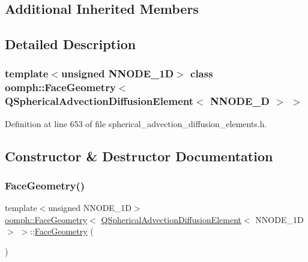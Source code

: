 \subsection*{Additional Inherited Members}


\subsection{Detailed Description}
\subsubsection*{template$<$unsigned N\+N\+O\+D\+E\+\_\+1D$>$\newline
class oomph\+::\+Face\+Geometry$<$ Q\+Spherical\+Advection\+Diffusion\+Element$<$ N\+N\+O\+D\+E\+\_\+D $>$ $>$}



Definition at line 653 of file spherical\+\_\+advection\+\_\+diffusion\+\_\+elements.\+h.



\subsection{Constructor \& Destructor Documentation}
\mbox{\label{classoomph_1_1FaceGeometry_3_01QSphericalAdvectionDiffusionElement_3_01NNODE__1D_01_4_01_4_a8ed2838c5dacbfa9facfb20466a60039}} 
\subsubsection{\texorpdfstring{Face\+Geometry()}{FaceGeometry()}}
{\footnotesize\ttfamily template$<$unsigned N\+N\+O\+D\+E\+\_\+1D$>$ \\
\hyperlink{classoomph_1_1FaceGeometry}{oomph\+::\+Face\+Geometry}$<$ \hyperlink{classoomph_1_1QSphericalAdvectionDiffusionElement}{Q\+Spherical\+Advection\+Diffusion\+Element}$<$ N\+N\+O\+D\+E\+\_\+1D $>$ $>$\+::\hyperlink{classoomph_1_1FaceGeometry}{Face\+Geometry} (\begin{DoxyParamCaption}{ }\end{DoxyParamCaption})\hspace{0.3cm}{\ttfamily [inline]}}



